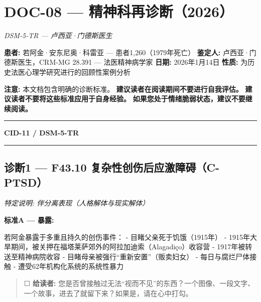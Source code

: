 \section*{\textbf{DOC-08} --- 精神科再诊断（2026）}

\noindent \textit{DSM-5-TR --- 卢西亚·门德斯医生}

\noindent \textbf{患者:} 若阿金·安东尼奥·科雷亚 --- 患者1,260（1979年死亡）
\noindent \textbf{鉴定人:} 卢西亚·门德斯医生，CRM-MG 28.391 --- 法医精神病学家
\noindent \textbf{日期:} 2026年1月14日
\noindent \textbf{性质:} 为历史法医心理学研究进行的回顾性案例分析

\noindent \textbf{注意:} 本文档包含明确的诊断标准。
\noindent \textbf{建议读者在阅读期间不要进行自我评估。}
\noindent \textbf{建议读者不要将这些标准应用于自身经验。}
\noindent \textbf{如果您处于情绪脆弱状态，建议不要继续阅读。}

\vspace{0.5em}\noindent\rule{\textwidth}{0.5pt}\vspace{0.5em}

\noindent \textbf{CID-11 / DSM-5-TR}

\vspace{0.5em}\noindent\rule{\textwidth}{0.5pt}\vspace{0.5em}

\subsection*{诊断1 --- F43.10 复杂性创伤后应激障碍（C-PTSD）}
\textit{特定说明: 伴分离表现（人格解体与现实解体）}

\noindent \textbf{标准A --- 暴露:}

\noindent 若阿金暴露于多重且持久的创伤事件：
\noindent - 目睹父亲死于饥饿（1915年）
\noindent - 1915年大旱期间，被关押在福塔莱萨郊外的阿拉加迪索（Alagadiço）收容营
\noindent - 1917年被转送至精神病院收容
\noindent - 目睹母亲被强行\textquotedblleft{重新安置\textquotedblright{}}（贩卖妇女）
\noindent - 每日与腐烂尸体接触
\noindent - 遭受62年机构化系统的系统性暴力

\begin{quote}
☐ \textbf{给读者:} 您是否曾接触过无法\textquotedblleft{视而不见\textquotedblright{}}的东西？一个图像、一段文字、一个故事，进去了就留下来？如果是，请在心中打勾。
\end{quote}

